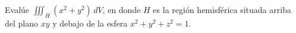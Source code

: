 \item Evalúe $\iiint_H (x^2 + y^2) \, dV$, en donde $H$ es la región hemisférica situada arriba del plano $xy$ y debajo de la esfera $x^2 + y^2 + z^2 = 1$.

